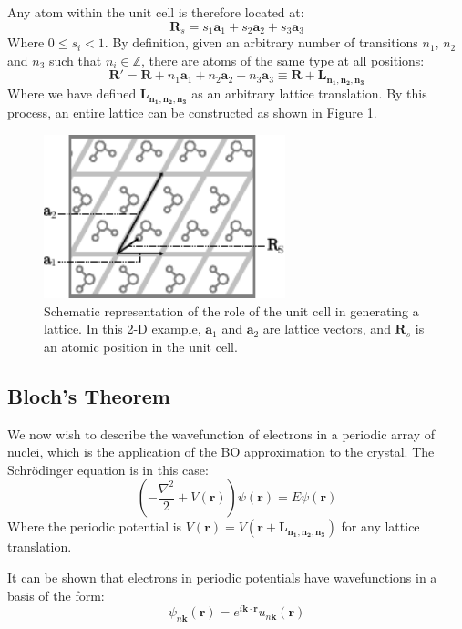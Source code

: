 Any atom within the unit cell is therefore located at:
\begin{equation}
    \bm{R}_s = s_1\bm{a}_1 + s_2\bm{a}_2 + s_3\bm{a}_3
\end{equation}
Where $0\le{}s_i<1$. By definition, given an arbitrary number of transitions $n_1$, $n_2$ and $n_3$ such that $n_i \in \mathbb{Z}$, there are atoms of the same type at all positions:
\begin{equation}
    \bm{R}' = \bm{R} + n_1\bm{a}_1 + n_2\bm{a}_2 + n_3\bm{a}_3 \equiv \bm{R} + \bm{L_{n_1,n_2,n_3}}
\end{equation}
Where we have defined $\bm{L_{n_1,n_2,n_3}}$ as an arbitrary lattice translation. By this process, an entire lattice can be constructed as shown in Figure \ref{fig:lat_diag}.

\begin{figure}
\centering
\includegraphics[width=7cm]{Chapters/2Methods/lattice_diagram.pdf}
\caption{Schematic representation of the role of the unit cell in generating a lattice. In this 2-D example, $\bm{a}_1$ and $\bm{a}_2$ are lattice vectors, and $\bm{R}_s$ is an atomic position in the unit cell.}
\label{fig:lat_diag}
\end{figure}

\subsection{Bloch's Theorem}
We now wish to describe the wavefunction of electrons in a periodic array of nuclei, which is the application of the BO approximation to the crystal. The Schr\"{o}dinger equation is in this case:
\begin{equation}
    \left( - \frac{\nabla^2}{2} + V(\bm{r})\right) \psi(\bm{r}) = E\psi(\bm{r})
\end{equation}
Where the periodic potential is $V(\bm{r}) = V(\bm{r} + \bm{L_{n_1,n_2,n_3}})$ for any lattice translation.

It can be shown that electrons in periodic potentials have wavefunctions in a basis of the form:
\begin{equation}
    \psi_{n\bm{k}}(\bm{r}) = e^{i\bm{k}\cdot\bm{r}} u_{n\bm{k}}(\bm{r})
    \label{eq:bloch}
\end{equation}

